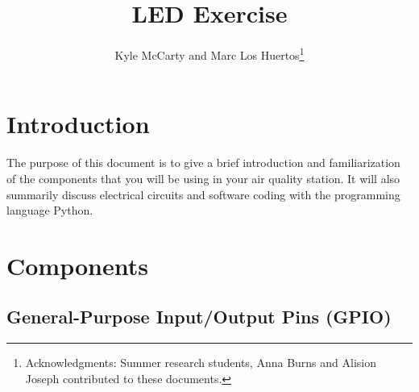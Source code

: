 \documentclass{article}\usepackage[]{graphicx}\usepackage[]{color}
\title{LED Exercise}
\author{Kyle McCarty and Marc Los Huertos\footnote{Acknowledgments: Summer research students, Anna Burns and Alision Joseph contributed to these documents.}}
\begin{document}
\maketitle

\tableofcontents

\newpage

\section{Introduction}

The purpose of this document is to give a brief introduction and familiarization of the components that you will be using in your air quality station. It will also summarily discuss electrical circuits and software coding with the programming language Python.

\section{Components}

\subsection{General-Purpose Input/Output Pins (GPIO)}
\end{document}
